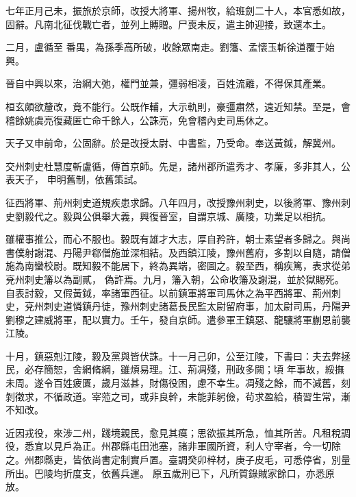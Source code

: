 
\begin{pinyinscope}

 七年正月己未，振旅於京師，改授大將軍、揚州牧，給班劍二十人，本官悉如故，固辭。凡南北征伐戰亡者，並列上賻贈。尸喪未反，遣主帥迎接，致還本土。



 二月，盧循至
 番禺，為孫季高所破，收餘眾南走。劉籓、孟懷玉斬徐道覆于始興。



 晉自中興以來，治綱大弛，權門並兼，彊弱相凌，百姓流離，不得保其產業。



 桓玄頗欲釐改，竟不能行。公既作輔，大示軌則，豪彊肅然，遠近知禁。至是，會稽餘姚虞亮復藏匿亡命千餘人，公誅亮，免會稽內史司馬休之。



 天子又申前命，公固辭。於是改授太尉、中書監，乃受命。奉送黃鉞，解冀州。



 交州刺史杜慧度斬盧循，傳首京師。先是，諸州郡所遣秀才、孝廉，多非其人，公表天子，
 申明舊制，依舊策試。



 征西將軍、荊州刺史道規疾患求歸。八年四月，改授豫州刺史，以後將軍、豫州刺史劉毅代之。毅與公俱舉大義，興復晉室，自謂京城、廣陵，功業足以相抗。



 雖權事推公，而心不服也。毅既有雄才大志，厚自矜許，朝士素望者多歸之。與尚書僕射謝混、丹陽尹郗僧施並深相結。及西鎮江陵，豫州舊府，多割以自隨，請僧施為南蠻校尉。既知毅不能居下，終為異端，密圖之。毅至西，稱疾篤，表求從弟兗州刺史籓以為副貳，
 偽許焉。九月，籓入朝，公命收籓及謝混，並於獄賜死。自表討毅，又假黃鉞，率諸軍西征。以前鎮軍將軍司馬休之為平西將軍、荊州刺史，兗州刺史道憐鎮丹徒，豫州刺史諸葛長民監太尉留府事，加太尉司馬，丹陽尹劉穆之建威將軍，配以實力。壬午，發自京師。遣參軍王鎮惡、龍驤將軍蒯恩前襲江陵。



 十月，鎮惡剋江陵，毅及黨與皆伏誅。十一月己卯，公至江陵，下書曰：夫去弊拯民，必存簡恕，舍網脩綱，雖煩易理。江、荊凋殘，刑政多闕；頃
 年事故，綏撫未周。遂令百姓疲匱，歲月滋甚，財傷役困，慮不幸生。凋殘之餘，而不減舊，刻剝徵求，不循政道。宰蒞之司，或非良幹，未能菲躬儉，茍求盈給，積習生常，漸不知改。



 近因戎役，來涉二州，踐境親民，愈見其瘼；思欲振其所急，恤其所苦。凡租稅調役，悉宜以見戶為正。州郡縣屯田池塞，諸非軍國所資，利人守宰者，今一切除之。州郡縣吏，皆依尚書定制實戶置。臺調癸卯梓材，庚子皮毛，可悉停省，別量所出。巴陵均折度支，依舊兵運。
 原五歲刑已下，凡所質錄賊家餘口，亦悉原放。




\end{pinyinscope}
